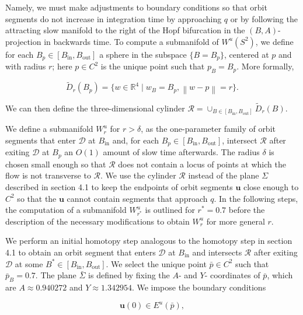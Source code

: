\documentclass{ws-ijbc}
\begin{document}
Namely, we must make adjustments to boundary conditions so that orbit segments do not increase in integration time by approaching $q$ or by following the attracting slow manifold to the right of the Hopf bifurcation in the $(B,A)$-projection in backwards time.  To compute a submanifold of $W^u(S^2)$, we define for each $B_p \in [B_{\mathrm{in}}, B_{\mathrm{out}}]$ a sphere in the subspace $\{B=B_p\}$, centered at $p$ and with radius $r$; here $p \in C^2$ is the unique point such that $p_B = B_p$.  More formally,

\begin{equation*}
\widetilde{D}_r(B_p)=\{w \in \mathbb{R}^4 \;|\; w_B = B_p, \left\lVert w-p \right\lVert  = r\}.
\end{equation*}

\noindent
We can then define the three-dimensional cylinder $\mathscr{R} = \cup_{B \in [B_{\mathrm{in}}, B_{\mathrm{out}}]}\widetilde{D}_r(B)$.  

We define a submanifold $W^u_r$ for $r>\delta$, as the one-parameter family of orbit segments that enter $\mathscr{D}$ at $B_{\mathrm{in}}$ and, for each $B_p \in [B_{\mathrm{in}}, B_{\mathrm{out}}]$, intersect $\mathscr{R}$ after exiting $\mathscr{D}$ at $B_p$ an $O(1)$ amount of slow time afterwards.  The radius $\delta$ is chosen small enough so that $\mathscr{R}$ does not contain a locus of points at which the flow is not transverse to $\mathscr{R}$.  We use the cylinder $\mathscr{R}$ instead of the plane $\Sigma$ described in section 4.1 to keep the endpoints of orbit segments $\mathbf{u}$ close enough to $C^2$ so that the $\mathbf{u}$ cannot contain segments that approach $q$.  In the following steps, the computation of a submanifold $W^u_{r^*}$ is outlined for $r^*=0.7$ before the description of the necessary modifications to obtain $W^u_r$ for more general $r$. 

We perform an initial homotopy step analogous to the homotopy step in section 4.1 to obtain an orbit segment that enters $\mathscr{D}$ at $B_{\mathrm{in}}$ and intersects $\mathscr{R}$ after exiting $\mathscr{D}$ at some $B^* \in [B_{\mathrm{in}}, B_{\mathrm{out}}]$.  We select the unique point $\bar{p} \in C^2$ such that $\bar{p}_B=0.7$.  The plane $\bar{\Sigma}$ is defined by fixing the $A$- and $Y$- coordinates of $\bar{p}$, which are $A \approx 0.940272$ and $Y \approx 1.342954$.  We impose the boundary conditions

\begin{equation}
\mathbf{u}(0) \in E^u(\bar{p}),
\label{BC1_unstable}
\end{equation}
\end{document}
